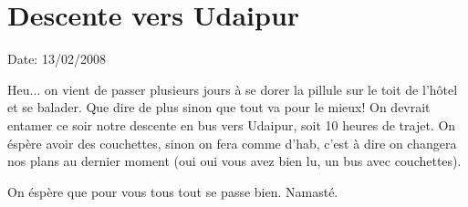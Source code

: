 \section{Descente vers Udaipur}

Date: 13/02/2008

\begin{multicols}{2}

Heu... on vient de passer plusieurs jours à se dorer la pillule sur le toit de l'hôtel et se balader. Que dire de plus sinon que tout va pour le mieux! On devrait entamer ce soir notre descente en bus vers Udaipur, soit 10 heures de trajet. On éspère avoir des couchettes, sinon on fera comme d'hab, c'est à dire on changera nos plans au dernier moment (oui oui vous avez bien lu, un bus avec couchettes).

On éspère que pour vous tous tout se passe bien. Namasté.

\end{multicols}



